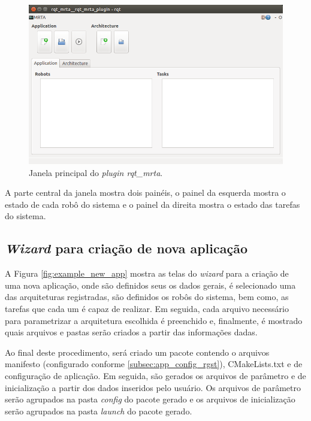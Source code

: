             \begin{figure}[htb]
                \centering
                \includegraphics[width=.8\textwidth]{Figuras/3_desenvolvimento/rqt_mrta_front.png}
                \caption{Janela principal do \textit{plugin rqt\_mrta}.} \label{fig:rqt_mrta_front}
            \end{figure}
            
            A parte central da janela mostra dois painéis, o painel da esquerda mostra o estado de cada robô do sistema e o painel da direita mostra o estado das tarefas do sistema.
        
        \subsection{\textit{Wizard} para criação de nova aplicação} \label{subsec:wizard_new_app}
            A Figura \ref{fig:example_new_app} mostra as telas do \textit{wizard} para a criação de uma nova aplicação, onde são definidos seus os dados gerais, é selecionado uma das arquiteturas registradas, são definidos os robôs do sistema, bem como, as tarefas que cada um é capaz de realizar. Em seguida, cada arquivo necessário para parametrizar a arquitetura escolhida é preenchido e, finalmente, é mostrado quais arquivos e pastas serão criados a partir das informações dadas. 
            
            Ao final deste procedimento, será criado um pacote contendo o arquivos manifesto (configurado conforme \ref{subsec:app_config_rgst}), CMakeLists.txt e de configuração de aplicação. Em seguida, são gerados os arquivos de parâmetro e de inicialização a partir dos dados inseridos pelo usuário. Os arquivos de parâmetro serão agrupados na pasta \textit{config} do pacote gerado e os arquivos de inicialização serão agrupados na pasta \textit{launch} do pacote gerado.
            
